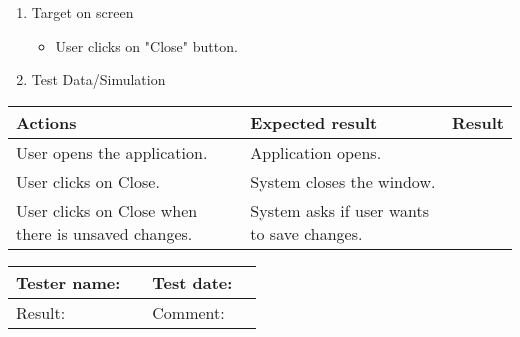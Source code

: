 \begin{enumerate}
	\item Target on screen
	\begin{itemize}
		\item User clicks on "Close" button.
	\end{itemize}
	\item Test Data/Simulation
\end{enumerate}
	\begin{tabularx}{\textwidth}{|X|X|p{2.5cm}|}\hline
		Actions & Expected result & Result \\\hline
		User opens the application.& Application opens. &  \pass \\\hline
		User clicks on Close. & System closes the window. & \pass \\\hline
		User clicks on Close when there is unsaved changes. & System asks if user wants to save changes. & \pass \\\hline
	\end{tabularx}

\begin{tabularx}{\textwidth}{|p{3cm}X|p{3cm}X|}\hline
	Tester name: &  & Test date: & \\\hline
	Result: &  \pass & Comment: & \\\hline
\end{tabularx}





